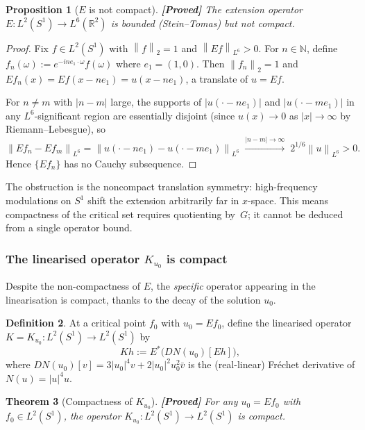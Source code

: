 \documentclass[12pt]{article}
\newtheorem{theorem}{Theorem}[section]
\newtheorem{proposition}[theorem]{Proposition}
\theoremstyle{definition}
\newtheorem{definition}[theorem]{Definition}
\theoremstyle{remark}
\newcommand{\R}{\mathbb{R}}
\newcommand{\N}{\mathbb{N}}
\newcommand{\norm}[1]{\left\|#1\right\|}
\newcommand{\proven}{\textbf{\color{teal}[Proved]}}
\begin{document}
\begin{proposition}[$E$ is not compact]
  \label{prop:E-not-compact}
  \proven\quad
  The extension operator $E:L^2(S^1)\to L^6(\R^2)$ is bounded
  (Stein--Tomas) but not compact.
\end{proposition}

\begin{proof}
  Fix $f\in L^2(S^1)$ with $\norm{f}_2=1$ and $\norm{Ef}_{L^6}>0$.
  For $n\in\N$, define $f_n(\omega):=e^{-ine_1\cdot\omega}f(\omega)$
  where $e_1=(1,0)$.  Then $\norm{f_n}_2=1$ and
  $Ef_n(x)=Ef(x-ne_1)=u(x-ne_1)$, a translate of $u=Ef$.

  For $n\neq m$ with $|n-m|$ large, the supports of $|u(\cdot-ne_1)|$ and
  $|u(\cdot-me_1)|$ in any $L^6$-significant region are essentially disjoint
  (since $u(x)\to 0$ as $|x|\to\infty$ by Riemann--Lebesgue), so
  \[
    \norm{Ef_n-Ef_m}_{L^6}
    = \norm{u(\cdot-ne_1)-u(\cdot-me_1)}_{L^6}
    \;\xrightarrow{|n-m|\to\infty}\;
    2^{1/6}\norm{u}_{L^6}>0.
  \]
  Hence $\{Ef_n\}$ has no Cauchy subsequence.
\end{proof}

The obstruction is the noncompact translation symmetry: high-frequency
modulations on $S^1$ shift the extension arbitrarily far in $x$-space.
This means compactness of the critical set requires quotienting by~$G$;
it cannot be deduced from a single operator bound.

\subsubsection{The linearised operator $K_{u_0}$ is compact}

Despite the non-compactness of $E$, the \emph{specific} operator appearing
in the linearisation is compact, thanks to the decay of the solution $u_0$.

\begin{definition}
  At a critical point $f_0$ with $u_0=Ef_0$, define the linearised operator
  $K=K_{u_0}:L^2(S^1)\to L^2(S^1)$ by
  \[
    Kh := E^*\bigl(DN(u_0)[Eh]\bigr),
  \]
  where $DN(u_0)[v]=3|u_0|^4v+2|u_0|^2u_0^2\bar v$ is the (real-linear)
  Fr\'echet derivative of $N(u)=|u|^4u$.
\end{definition}

\begin{theorem}[Compactness of $K_{u_0}$]
  \label{thm:K-compact}
  \proven\quad
  For any $u_0=Ef_0$ with $f_0\in L^2(S^1)$, the operator
  $K_{u_0}:L^2(S^1)\to L^2(S^1)$ is compact.
\end{theorem}
\end{document}
